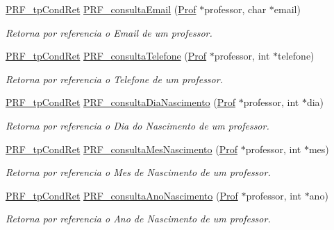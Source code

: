 \begin{DoxyCompactItemize}
\hyperlink{group__modulo_professor_ga777e215896d573d2e99d98793b1f0ed1}{P\+R\+F\+\_\+tp\+Cond\+Ret} \hyperlink{group__funcoes_consulta_ga8f82f0083292830b07ae87886b1391f4}{P\+R\+F\+\_\+consulta\+Email} (\hyperlink{structprof}{Prof} $\ast$professor, char $\ast$email)
\begin{DoxyCompactList}\small\item\em Retorna por referencia o Email de um professor. \end{DoxyCompactList}\item 
\hyperlink{group__modulo_professor_ga777e215896d573d2e99d98793b1f0ed1}{P\+R\+F\+\_\+tp\+Cond\+Ret} \hyperlink{group__funcoes_consulta_gaeb7c31b9566b846bf56494458a0c6bd9}{P\+R\+F\+\_\+consulta\+Telefone} (\hyperlink{structprof}{Prof} $\ast$professor, int $\ast$telefone)
\begin{DoxyCompactList}\small\item\em Retorna por referencia o Telefone de um professor. \end{DoxyCompactList}\item 
\hyperlink{group__modulo_professor_ga777e215896d573d2e99d98793b1f0ed1}{P\+R\+F\+\_\+tp\+Cond\+Ret} \hyperlink{group__funcoes_consulta_gad7991a98ebd19eba541712d43c031f30}{P\+R\+F\+\_\+consulta\+Dia\+Nascimento} (\hyperlink{structprof}{Prof} $\ast$professor, int $\ast$dia)
\begin{DoxyCompactList}\small\item\em Retorna por referencia o Dia do Nascimento de um professor. \end{DoxyCompactList}\item 
\hyperlink{group__modulo_professor_ga777e215896d573d2e99d98793b1f0ed1}{P\+R\+F\+\_\+tp\+Cond\+Ret} \hyperlink{group__funcoes_consulta_gac2c49f880ea6cb477bb2695fb7dee346}{P\+R\+F\+\_\+consulta\+Mes\+Nascimento} (\hyperlink{structprof}{Prof} $\ast$professor, int $\ast$mes)
\begin{DoxyCompactList}\small\item\em Retorna por referencia o Mes de Nascimento de um professor. \end{DoxyCompactList}\item 
\hyperlink{group__modulo_professor_ga777e215896d573d2e99d98793b1f0ed1}{P\+R\+F\+\_\+tp\+Cond\+Ret} \hyperlink{group__funcoes_consulta_ga80b3e3e5dfb090a9c28280073cd471f5}{P\+R\+F\+\_\+consulta\+Ano\+Nascimento} (\hyperlink{structprof}{Prof} $\ast$professor, int $\ast$ano)
\begin{DoxyCompactList}\small\item\em Retorna por referencia o Ano de Nascimento de um professor. \end{DoxyCompactList}\item 

\end{DoxyCompactItemize}
